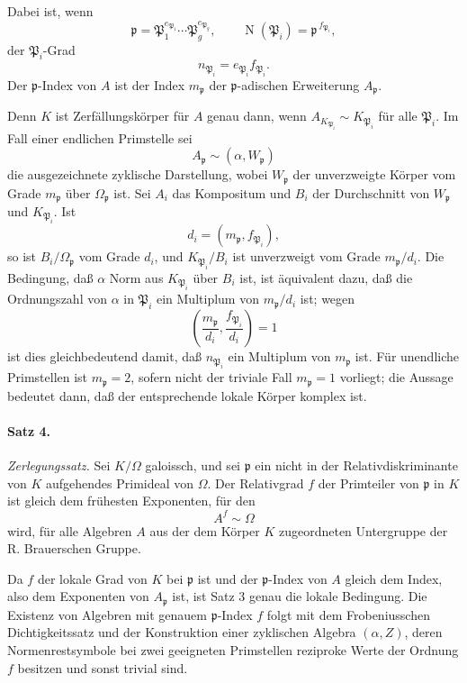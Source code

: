 \documentclass[11pt]{article}
\providecommand{\Om}{\Omega}
\providecommand{\N}{\operatorname{N}}
\begin{document}
Dabei ist, wenn
\[
        \mathfrak p=\mathfrak P_1^{e_{\mathfrak P_1}}\cdots
        \mathfrak P_g^{e_{\mathfrak P_g}},
        \qquad
        \N(\mathfrak P_i)=\mathfrak p^{\,f_{\mathfrak P_i}},
\]
der \(\mathfrak P_i\)-Grad
\[
        n_{\mathfrak P_i}=e_{\mathfrak P_i}f_{\mathfrak P_i}.
\]
Der \(\mathfrak p\)-Index von \(A\) ist der Index \(m_{\mathfrak p}\) der \(\mathfrak p\)-adischen Erweiterung \(A_{\mathfrak p}\).

Denn \(K\) ist Zerfällungskörper für \(A\) genau dann, wenn \(A_{K_{\mathfrak P_i}}\sim K_{\mathfrak P_i}\) für alle \(\mathfrak P_i\). Im Fall einer endlichen Primstelle sei
\[
        A_{\mathfrak p}\sim(\alpha,W_{\mathfrak p})
\]
die ausgezeichnete zyklische Darstellung, wobei \(W_{\mathfrak p}\) der unverzweigte Körper vom Grade \(m_{\mathfrak p}\) über \(\Om_{\mathfrak p}\) ist. Sei \(A_i\) das Kompositum und \(B_i\) der Durchschnitt von \(W_{\mathfrak p}\) und \(K_{\mathfrak P_i}\). Ist
\[
        d_i=(m_{\mathfrak p},f_{\mathfrak P_i}),
\]
so ist \(B_i/\Om_{\mathfrak p}\) vom Grade \(d_i\), und \(K_{\mathfrak P_i}/B_i\) ist unverzweigt vom Grade \(m_{\mathfrak p}/d_i\). Die Bedingung, daß \(\alpha\) Norm aus \(K_{\mathfrak P_i}\) über \(B_i\) ist, ist äquivalent dazu, daß die Ordnungszahl von \(\alpha\) in \(\mathfrak P_i\) ein Multiplum von \(m_{\mathfrak p}/d_i\) ist; wegen
\[
        \left(\frac{m_{\mathfrak p}}{d_i},\frac{f_{\mathfrak P_i}}{d_i}\right)=1
\]
ist dies gleichbedeutend damit, daß \(n_{\mathfrak P_i}\) ein Multiplum von \(m_{\mathfrak p}\) ist. Für unendliche Primstellen ist \(m_{\mathfrak p}=2\), sofern nicht der triviale Fall \(m_{\mathfrak p}=1\) vorliegt; die Aussage bedeutet dann, daß der entsprechende lokale Körper komplex ist.

\paragraph{Satz 4.}
\emph{Zerlegungssatz.} Sei \(K/\Om\) galoissch, und sei \(\mathfrak p\) ein nicht in der Relativdiskriminante von \(K\) aufgehendes Primideal von \(\Om\). Der Relativgrad \(f\) der Primteiler von \(\mathfrak p\) in \(K\) ist gleich dem frühesten Exponenten, für den
\[
        A^f\sim\Om
\]
wird, für alle Algebren \(A\) aus der dem Körper \(K\) zugeordneten Untergruppe der R. Brauerschen Gruppe.

Da \(f\) der lokale Grad von \(K\) bei \(\mathfrak p\) ist und der \(\mathfrak p\)-Index von \(A\) gleich dem Index, also dem Exponenten von \(A_{\mathfrak p}\) ist, ist Satz 3 genau die lokale Bedingung. Die Existenz von Algebren mit genauem \(\mathfrak p\)-Index \(f\) folgt mit dem Frobeniusschen Dichtigkeitssatz und der Konstruktion einer zyklischen Algebra \((\alpha,Z)\), deren Normenrestsymbole bei zwei geeigneten Primstellen reziproke Werte der Ordnung \(f\) besitzen und sonst trivial sind.
\end{document}
